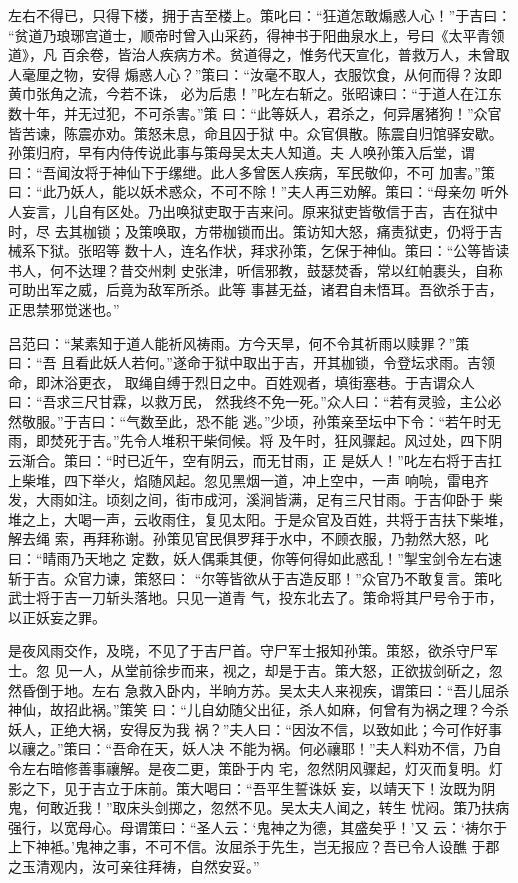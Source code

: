 左右不得已，只得下楼，拥于吉至楼上。策叱曰：“狂道怎敢煽惑人心！”于吉曰：
“贫道乃琅琊宫道士，顺帝时曾入山采药，得神书于阳曲泉水上，号曰《太平青领道》，凡
百余卷，皆治人疾病方术。贫道得之，惟务代天宣化，普救万人，未曾取人毫厘之物，安得
煽惑人心？”策曰：“汝毫不取人，衣服饮食，从何而得？汝即黄巾张角之流，今若不诛，
必为后患！”叱左右斩之。张昭谏曰：“于道人在江东数十年，并无过犯，不可杀害。”策
曰：“此等妖人，君杀之，何异屠猪狗！”众官皆苦谏，陈震亦劝。策怒未息，命且囚于狱
中。众官俱散。陈震自归馆驿安歇。孙策归府，早有内侍传说此事与策母吴太夫人知道。夫
人唤孙策入后堂，谓曰：“吾闻汝将于神仙下于缧绁。此人多曾医人疾病，军民敬仰，不可
加害。”策曰：“此乃妖人，能以妖术惑众，不可不除！”夫人再三劝解。策曰：“母亲勿
听外人妄言，儿自有区处。乃出唤狱吏取于吉来问。原来狱吏皆敬信于吉，吉在狱中时，尽
去其枷锁；及策唤取，方带枷锁而出。策访知大怒，痛责狱吏，仍将于吉械系下狱。张昭等
数十人，连名作状，拜求孙策，乞保于神仙。策曰：“公等皆读书人，何不达理？昔交州刺
史张津，听信邪教，鼓瑟焚香，常以红帕裹头，自称可助出军之威，后竟为敌军所杀。此等
事甚无益，诸君自未悟耳。吾欲杀于吉，正思禁邪觉迷也。”

吕范曰：“某素知于道人能祈风祷雨。方今天旱，何不令其祈雨以赎罪？”策曰：“吾
且看此妖人若何。”遂命于狱中取出于吉，开其枷锁，令登坛求雨。吉领命，即沐浴更衣，
取绳自缚于烈日之中。百姓观者，填街塞巷。于吉谓众人曰：“吾求三尺甘霖，以救万民，
然我终不免一死。”众人曰：“若有灵验，主公必然敬服。”于吉曰：“气数至此，恐不能
逃。”少顷，孙策亲至坛中下令：“若午时无雨，即焚死于吉。”先令人堆积干柴伺候。将
及午时，狂风骤起。风过处，四下阴云渐合。策曰：“时已近午，空有阴云，而无甘雨，正
是妖人！”叱左右将于吉扛上柴堆，四下举火，焰随风起。忽见黑烟一道，冲上空中，一声
响喨，雷电齐发，大雨如注。顷刻之间，街市成河，溪涧皆满，足有三尺甘雨。于吉仰卧于
柴堆之上，大喝一声，云收雨住，复见太阳。于是众官及百姓，共将于吉扶下柴堆，解去绳
索，再拜称谢。孙策见官民俱罗拜于水中，不顾衣服，乃勃然大怒，叱曰：“晴雨乃天地之
定数，妖人偶乘其便，你等何得如此惑乱！”掣宝剑令左右速斩于吉。众官力谏，策怒曰：
“尔等皆欲从于吉造反耶！”众官乃不敢复言。策叱武士将于吉一刀斩头落地。只见一道青
气，投东北去了。策命将其尸号令于市，以正妖妄之罪。

是夜风雨交作，及晓，不见了于吉尸首。守尸军士报知孙策。策怒，欲杀守尸军士。忽
见一人，从堂前徐步而来，视之，却是于吉。策大怒，正欲拔剑斫之，忽然昏倒于地。左右
急救入卧内，半晌方苏。吴太夫人来视疾，谓策曰：“吾儿屈杀神仙，故招此祸。”策笑
曰：“儿自幼随父出征，杀人如麻，何曾有为祸之理？今杀妖人，正绝大祸，安得反为我
祸？”夫人曰：“因汝不信，以致如此；今可作好事以禳之。”策曰：“吾命在天，妖人决
不能为祸。何必禳耶！”夫人料劝不信，乃自令左右暗修善事禳解。是夜二更，策卧于内
宅，忽然阴风骤起，灯灭而复明。灯影之下，见于吉立于床前。策大喝曰：“吾平生誓诛妖
妄，以靖天下！汝既为阴鬼，何敢近我！”取床头剑掷之，忽然不见。吴太夫人闻之，转生
忧闷。策乃扶病强行，以宽母心。母谓策曰：“圣人云：‘鬼神之为德，其盛矣乎！’又
云：‘祷尔于上下神袛。’鬼神之事，不可不信。汝屈杀于先生，岂无报应？吾已令人设醮
于郡之玉清观内，汝可亲往拜祷，自然安妥。”

